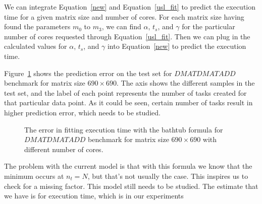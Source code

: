 \vspace{\baselineskip}	
We can integrate Equation~\ref{new} and Equation~\ref{usl_fit} to predict the execution time for a given matrix size and number of cores.
For each matrix size having found the parameters $m_0$ to $m_3$, we can find $\alpha$, $t_s$, and $\gamma$ for the particular number of cores requested through Equation~\ref{usl_fit}. Then we can plug in the calculated values for $\alpha$, $t_s$, and $\gamma$ into Equation~\ref{new} to predict the execution time.

Figure~\ref{fig25} shows the prediction error on the test set for $DMATDMATADD$ benchmark for matrix size $690\times690$. The axis shows the different samples in the test set, and the label of each point represents the number of tasks created for that particular data point. As it could be seen, certain number of tasks result in higher prediction error, which needs to be studied.


\vspace{\baselineskip}	
\begin{figure}[H]
	\caption{The error in fitting execution time with the bathtub formula for $DMATDMATADD$ benchmark for matrix size $690\times690$ with different number of cores.}	
	\label{fig25}
\end{figure}

The problem with the current model is that with this formula we know that the minimum occurs at $n_t=N$, but that's not usually the case. This inspires us to check for a missing factor. 
This model still needs to be studied. The estimate that we have is for execution time, which is in our experiments 

\vspace{\baselineskip}	 